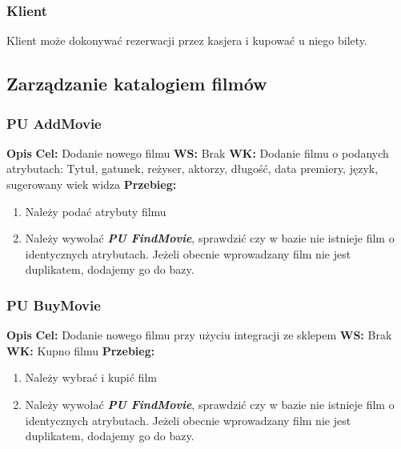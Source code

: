 \documentclass{article}
\begin{document}
	\subsubsection{Klient}
	\par Klient może dokonywać rezerwacji przez kasjera i kupować u niego bilety.
	
	\newpage
	\subsection{Zarządzanie katalogiem filmów}
	\subsubsection{PU AddMovie}
	\noindent \textbf{Opis}
	\newline \textbf{Cel: } Dodanie nowego filmu
	\newline \textbf{WS: } Brak
	\newline \textbf{WK: } Dodanie filmu o podanych atrybutach: Tytuł, gatunek, reżyser, aktorzy, długość, data premiery, język, sugerowany wiek widza
	\newline \textbf{Przebieg: }
	\begin{enumerate}
		\item Należy podać atrybuty filmu
		\item Należy wywołać \textit{\textbf{PU FindMovie}}, sprawdzić czy w bazie nie istnieje film o identycznych atrybutach. Jeżeli obecnie wprowadzany film nie jest duplikatem, dodajemy go do bazy.
	\end{enumerate}
	
	\subsubsection{PU BuyMovie}
	\noindent \textbf{Opis}
	\newline \textbf{Cel: } Dodanie nowego filmu przy użyciu integracji ze sklepem
	\newline \textbf{WS: } Brak
	\newline \textbf{WK: } Kupno filmu
	\newline \textbf{Przebieg: }
	\begin{enumerate}
		\item Należy wybrać i kupić film
		\item Należy wywołać \textit{\textbf{PU FindMovie}}, sprawdzić czy w bazie nie istnieje film o identycznych atrybutach. Jeżeli obecnie wprowadzany film nie jest duplikatem, dodajemy go do bazy.
	\end{enumerate}
	
\end{document}

